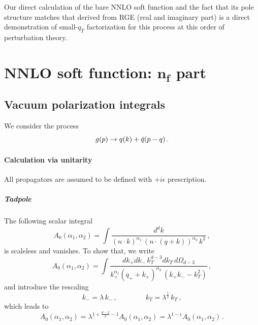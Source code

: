 \documentclass[a4paper,11pt]{report}
\numberwithin{equation}{section}
\newcommand{\kp}{k_+}
\newcommand{\km}{k_-}
\begin{document}
Our direct calculation of the bare NNLO soft function and the fact that its pole
structure matches that derived from RGE (real and imaginary part) is a direct
demonstration of small-$q_T$ factorization for this process at this order of
perturbation theory.

\chapter{NNLO soft function: $\mathbold{n_f}$ part}

\section{Vacuum polarization integrals}

We consider the process 
%
\begin{equation}
  g(p) \to q(k) + {\bar q}(p-q)\,.
\end{equation}

\subsubsection{Calculation via unitarity}

All propagators are assumed to be defined with $+i\epsilon$ prescription.

\paragraph{Tadpole}
%
The following scalar integral
%
\begin{equation}
  A_0(\alpha_1,\alpha_2) = 
  \int\frac{d^d k}{(n\cdot k)^{\alpha_1}\, (n\cdot (q+k))^{\alpha_2}\, k^2}\,,
\end{equation}
%
is scaleless and vanishes. To show that, we write
%
\begin{equation}
  A_0(\alpha_1,\alpha_2)  = 
  \int\frac{d\kp d\km\, k_T^{d-3} dk_T\, d\Omega_{d-3}}
  {k_+^{\alpha_1} (q_++\kp)^{\alpha_2}\, (\kp\km-k_T^2)}\,,
\end{equation}
%
and introduce the rescaling
\begin{equation}
  \km = \lambda\, \km\,, \qquad \qquad
  k_T = \lambda^\frac12\, k_T\,, 
\end{equation}
%
which leads to
%
\begin{equation}
  A_0(\alpha_1,\alpha_2)  = 
  \lambda^{1+\frac{d-2}{2}-1} A_0(\alpha_1,\alpha_2)   =
  \lambda^{1-\epsilon} A_0(\alpha_1,\alpha_2)\,. 
\end{equation}
\end{document}
